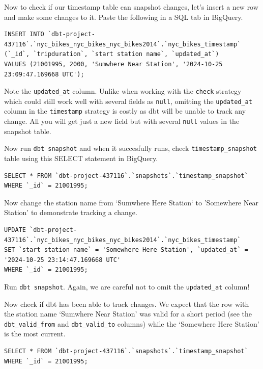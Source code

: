 \documentclass[
]{book}
\begin{document}
Now to check if our timestamp table can snapshot changes, let's insert a new row and make some changes to it. Paste the following in a SQL tab in BigQuery.

\begin{verbatim}
INSERT INTO `dbt-project-437116`.`nyc_bikes_nyc_bikes_nyc_bikes2014`.`nyc_bikes_timestamp` (`_id`, `tripduration`, `start station name`, `updated_at`) 
VALUES (21001995, 2000, 'Sumwhere Near Station', '2024-10-25 23:09:47.169668 UTC');
\end{verbatim}

Note the \texttt{updated\_at} column. Unlike when working with the \texttt{check} strategy which could still work well with several fields as \texttt{null}, omitting the \texttt{updated\_at} column in the \texttt{timestamp} strategy is costly as dbt will be unable to track any change. All you will get just a new field but with several \texttt{null} values in the snapshot table.

Now run \texttt{dbt\ snapshot} and when it succesfully runs, check \texttt{timestamp\_snapshot} table using this SELECT statement in BigQuery.

\begin{verbatim}
SELECT * FROM `dbt-project-437116`.`snapshots`.`timestamp_snapshot` 
WHERE `_id` = 21001995;
\end{verbatim}

Now change the station name from `Sumwhere Here Station` to 'Somewhere Near Station' to demonstrate tracking a change.

\begin{verbatim}
UPDATE `dbt-project-437116`.`nyc_bikes_nyc_bikes_nyc_bikes2014`.`nyc_bikes_timestamp`
SET `start station name` = 'Somewhere Here Station', `updated_at` = '2024-10-25 23:14:47.169668 UTC'
WHERE `_id` = 21001995;
\end{verbatim}

Run \texttt{dbt\ snapshot}. Again, we are careful not to omit the \texttt{updated\_at} column!

Now check if dbt has been able to track changes. We expect that the row with the station name `Sumwhere Near Station' was valid for a short period (see the \texttt{dbt\_valid\_from} and \texttt{dbt\_valid\_to} columns) while the `Somewhere Here Station' is the most current.

\begin{verbatim}
SELECT * FROM `dbt-project-437116`.`snapshots`.`timestamp_snapshot` 
WHERE `_id` = 21001995;
\end{verbatim}
\end{document}
